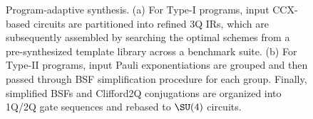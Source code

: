 \begin{figure}[tbp]
    \centering
    \caption{Program-adaptive synthesis. (a) For Type-I programs, input $\mathrm{CCX}$-based circuits are partitioned into refined 3Q IRs, which are subsequently assembled by searching the optimal schemes from a pre-synthesized template library across a benchmark suite. (b) For Type-II programs, input Pauli exponentiations are grouped and then passed through BSF simplification procedure for each group. Finally, simplified BSFs and Clifford2Q conjugations are organized into 1Q/2Q gate sequences and rebased to $\SU(4)$ circuits.}
    \label{fig:program_adaptive}
\end{figure}






